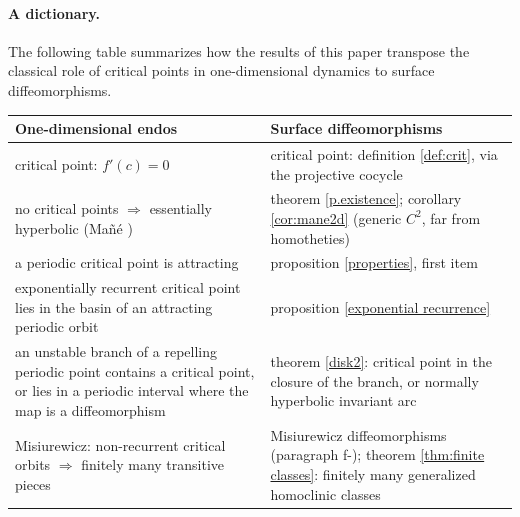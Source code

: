 \documentclass[a4paper,11pt]{article}
\theoremstyle{definition}
\begin{document}
\paragraph{A dictionary.} The following table summarizes how the results of
this paper transpose the classical role of critical points in one-dimensional
dynamics to surface diffeomorphisms.

\begin{center}
\begin{tabular}{p{}|p{}}
{\bf One-dimensional endos} & {\bf Surface diffeomorphisms}\\
\hline\hline
critical point: $f'(c)=0$ &
critical point: definition \ref{def:crit}, via the projective cocycle
\\
\hline
no critical points $\Rightarrow$ essentially hyperbolic (Ma\~n\'e \cite{M}) &
theorem \ref{p.existence}; corollary \ref{cor:mane2d} (generic $C^2$,
far from homotheties)\\
\hline
a periodic critical point is attracting &
proposition \ref{properties}, first item\\
\hline
exponentially recurrent critical point lies in the basin of an attracting
periodic orbit &
proposition \ref{exponential recurrence}\\
\hline
an unstable branch of a repelling periodic point contains a critical point,
or lies in a periodic interval where the map is a diffeomorphism &
theorem \ref{disk2}: critical point in the closure of the branch, or
normally hyperbolic invariant arc\\
\hline
Misiurewicz: non-recurrent critical orbits $\Rightarrow$ finitely many
transitive pieces &
Misiurewicz diffeomorphisms (paragraph f-); theorem
\ref{thm:finite classes}: finitely many generalized homoclinic classes\\
\end{tabular}
\end{center}
\end{document}
